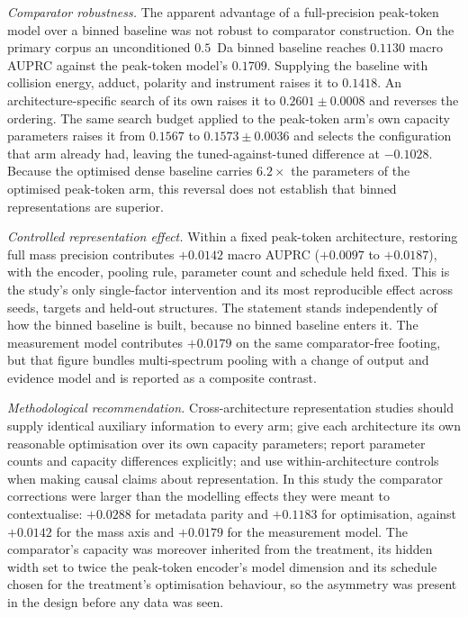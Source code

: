 \documentclass[11pt]{article}
\begin{document}
\emph{Comparator robustness.} The apparent advantage of a full-precision peak-token
model over a binned baseline was not robust to comparator construction. On the
primary corpus an unconditioned $0.5$~Da binned baseline reaches $0.1130$ macro
AUPRC against the peak-token model's $0.1709$. Supplying the baseline with collision
energy, adduct, polarity and instrument raises it to $0.1418$. An
architecture-specific search of its own raises it to $0.2601 \pm 0.0008$ and reverses
the ordering. The same search budget applied to the peak-token arm's own capacity
parameters raises it from $0.1567$ to $0.1573 \pm 0.0036$ and selects the
configuration that arm already had, leaving the tuned-against-tuned difference at
$-0.1028$. Because the optimised dense baseline carries $6.2\times$ the parameters of
the optimised peak-token arm, this reversal does not establish that binned
representations are superior.

\emph{Controlled representation effect.} Within a fixed peak-token architecture,
restoring full mass precision contributes $+0.0142$ macro AUPRC ($+0.0097$ to
$+0.0187$), with the encoder, pooling rule, parameter count and schedule held fixed.
This is the study's only single-factor intervention and its most reproducible effect
across seeds, targets and held-out structures. The statement stands independently of
how the binned baseline is built, because no binned baseline enters it. The
measurement model contributes $+0.0179$ on the same comparator-free footing, but that
figure bundles multi-spectrum pooling with a change of output and evidence model and
is reported as a composite contrast.

\emph{Methodological recommendation.} Cross-architecture representation studies
should supply identical auxiliary information to every arm; give each architecture
its own reasonable optimisation over its own capacity parameters; report parameter
counts and capacity differences explicitly; and use within-architecture controls when
making causal claims about representation. In this study the comparator corrections
were larger than the modelling effects they were meant to contextualise: $+0.0288$
for metadata parity and $+0.1183$ for optimisation, against $+0.0142$ for the mass
axis and $+0.0179$ for the measurement model. The comparator's capacity was moreover
inherited from the treatment, its hidden width set to twice the peak-token encoder's
model dimension and its schedule chosen for the treatment's optimisation behaviour,
so the asymmetry was present in the design before any data was seen.
\end{document}
